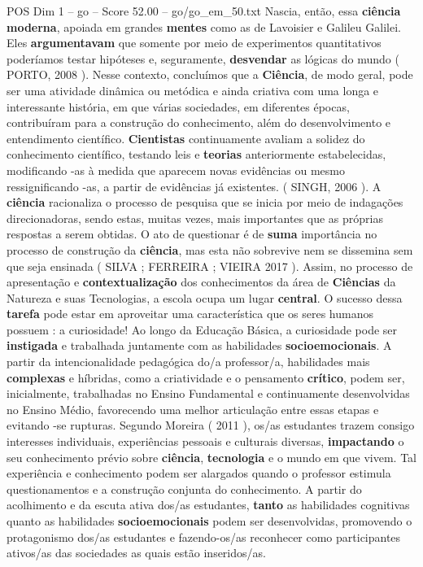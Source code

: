 \begin{textsample}{POS Dim 1 – go – Score 52.00 – go/go\_em\_50.txt}
Nascia, então, essa \textbf{ciência} \textbf{moderna}, apoiada em grandes \textbf{mentes} como as de Lavoisier e Galileu Galilei.
Eles \textbf{argumentavam} que somente por meio de experimentos quantitativos poderíamos testar hipóteses e, seguramente, \textbf{desvendar} as lógicas do mundo ( PORTO, 2008 ).
Nesse contexto, concluímos que a \textbf{Ciência}, de modo geral, pode ser uma atividade dinâmica ou metódica e ainda criativa com uma longa e interessante história, em que várias sociedades, em diferentes épocas, contribuíram para a construção do conhecimento, além do desenvolvimento e entendimento científico. \textbf{Cientistas} continuamente avaliam a solidez do conhecimento científico, testando leis e \textbf{teorias} anteriormente estabelecidas, modificando -as à medida que aparecem novas evidências ou mesmo ressignificando -as, a partir de evidências já existentes. ( SINGH, 2006 ).
A \textbf{ciência} racionaliza o processo de pesquisa que se inicia por meio de indagações direcionadoras, sendo estas, muitas vezes, mais importantes que as próprias respostas a serem obtidas.
O ato de questionar é de \textbf{suma} importância no processo de construção da \textbf{ciência}, mas esta não sobrevive nem se dissemina sem que seja ensinada ( SILVA ; FERREIRA ; VIEIRA 2017 ).
Assim, no processo de apresentação e \textbf{contextualização} dos conhecimentos da área de \textbf{Ciências} da Natureza e suas Tecnologias, a escola ocupa um lugar \textbf{central}.
O sucesso dessa \textbf{tarefa} pode estar em aproveitar uma característica que os seres humanos possuem : a curiosidade!
Ao longo da Educação Básica, a curiosidade pode ser \textbf{instigada} e trabalhada juntamente com as habilidades \textbf{socioemocionais}.
A partir da intencionalidade pedagógica do/a professor/a, habilidades mais \textbf{complexas} e híbridas, como a criatividade e o pensamento \textbf{crítico}, podem ser, inicialmente, trabalhadas no Ensino Fundamental e continuamente desenvolvidas no Ensino Médio, favorecendo uma melhor articulação entre essas etapas e evitando -se rupturas.
Segundo Moreira ( 2011 ), os/as estudantes trazem consigo interesses individuais, experiências pessoais e culturais diversas, \textbf{impactando} o seu conhecimento prévio sobre \textbf{ciência}, \textbf{tecnologia} e o mundo em que vivem.
Tal experiência e conhecimento podem ser alargados quando o professor estimula questionamentos e a construção conjunta do conhecimento.
A partir do acolhimento e da escuta ativa dos/as estudantes, \textbf{tanto} as habilidades cognitivas quanto as habilidades \textbf{socioemocionais} podem ser desenvolvidas, promovendo o protagonismo dos/as estudantes e fazendo-os/as reconhecer como participantes ativos/as das sociedades as quais estão inseridos/as.

\end{textsample}
